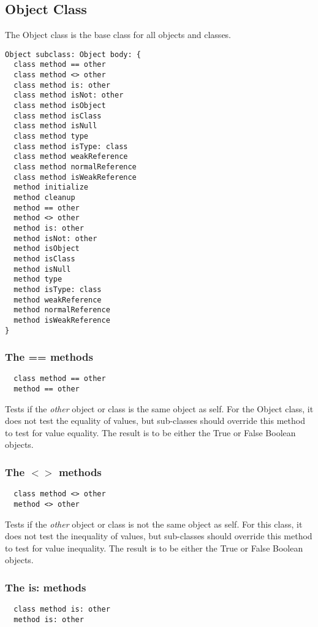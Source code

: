 \subsection {Object Class}

The Object class is the base class for all objects and classes.

\begin{lstlisting}
Object subclass: Object body: {
  class method == other
  class method <> other
  class method is: other
  class method isNot: other
  class method isObject
  class method isClass
  class method isNull
  class method type
  class method isType: class
  class method weakReference
  class method normalReference
  class method isWeakReference
  method initialize
  method cleanup
  method == other
  method <> other
  method is: other
  method isNot: other
  method isObject
  method isClass
  method isNull
  method type
  method isType: class
  method weakReference
  method normalReference
  method isWeakReference
}
\end{lstlisting}

\subsubsection {The == methods}
\begin{lstlisting}
  class method == other
  method == other
\end{lstlisting}

Tests if the \textit{other} object or class is the same object as self. For the Object class, it does not test the equality of values, but sub-classes should override this method to test for value equality. The result is to be either the True or False Boolean objects.

\hfill
\subsubsection {The $<>$ methods}
\begin{lstlisting}
  class method <> other
  method <> other
\end{lstlisting}

Tests if the \textit{other} object or class is not the same object as self. For this class, it does not test the inequality of values, but sub-classes should override this method to test for value inequality. The result is to be either the True or False Boolean objects.

\hfill
\subsubsection {The is: methods}
\begin{lstlisting}
  class method is: other
  method is: other
\end{lstlisting}

